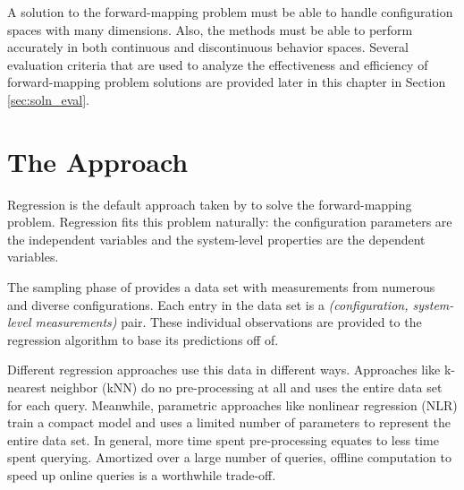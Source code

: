 A solution to the forward-mapping problem must be able to handle configuration spaces with many dimensions.
Also, the methods must be able to perform accurately in both continuous and discontinuous behavior spaces.
Several evaluation criteria that are used to analyze the effectiveness and efficiency of forward-mapping problem solutions are provided later in this chapter in Section \ref{sec:soln_eval}.


\section{The \fw Approach}

Regression is the default approach taken by \fw to solve the forward-mapping problem.
Regression fits this problem naturally: the configuration parameters are the independent variables and the system-level properties are the dependent variables.

The sampling phase of \fw provides a data set with measurements from numerous and diverse configurations.
Each entry in the data set is a \textit{(configuration, system-level measurements)} pair.
These individual observations are provided to the regression algorithm to base its predictions off of.

Different regression approaches use this data in different ways.
Approaches like k-nearest neighbor (kNN) do no pre-processing at all and uses the entire data set for each query.
Meanwhile, parametric approaches like nonlinear regression (NLR) train a compact model and uses a limited number of parameters to represent the entire data set.
In general, more time spent pre-processing equates to less time spent querying.
Amortized over a large number of queries, offline computation to speed up online queries is a worthwhile trade-off.

